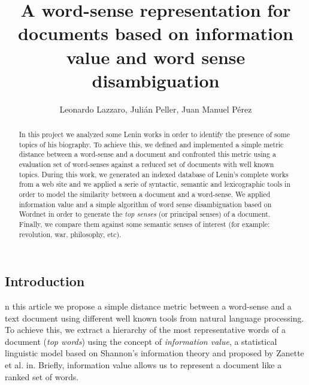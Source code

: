 \documentclass{pnastwo}
\begin{document}
\title{A word-sense representation for documents based on information value and word sense disambiguation}

\author{Leonardo Lazzaro,
Julián Peller,
Juan Manuel Pérez
}


\maketitle

\begin{article}
\begin{abstract}
In this project we analyzed some Lenin works in order to identify the presence of some topics of his biography. To achieve this, we defined and implemented a simple metric distance between a word-sense and a document and confronted this metric using a evaluation set of word-senses against a reduced set of  documents with well known topics. During this work, we generated an indexed database of Lenin's complete works from a web site\cite{LENIN} and we applied a serie of syntactic, semantic and lexicographic tools in order to model the similarity between a document and a word-sense. We applied information value\cite{DARWIN} and a simple algorithm of word sense disambiguation\cite{LESK} based on Wordnet\cite{WORDNET} in order to generate the \emph{top senses} (or principal senses) of a document. Finally, we compare them against some semantic senses of interest (for example: revolution, war, philosophy, etc). 
\end{abstract}



\section{Introduction}

n this article we propose a simple distance metric between a word-sense and a text document using different well known tools from natural language processing. To achieve this, we extract a hierarchy of the most representative words of a document (\textit{top words}) using the concept of \textit{information value}, a statistical linguistic model based on Shannon's information theory and proposed by Zanette et al. in\cite{DARWIN}. Briefly, information value allows us to represent a document like a ranked set of words. 


\end{article}
\end{document}
